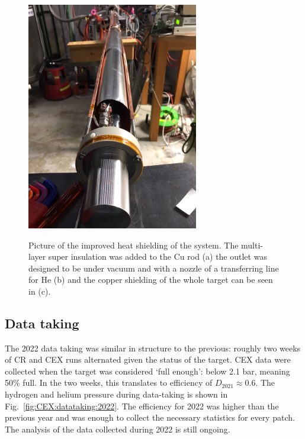 \begin{refsection}
\begin{figure}
{            \includegraphics[height = 10cm, keepaspectratio]{Figures/LH2/2022/CEX2022_shielding.jpeg}}
            \caption{Picture of the improved heat shielding of the system. The multi-layer super insulation was added to the Cu rod (a) the outlet was designed to be under vacuum and with a nozzle of a transferring line for He (b) and the copper shielding of the whole target can be seen in (c).}
            \label{fig:CEX:2022:insulation}
        \end{figure}
        
    \subsection{Data taking}
        The 2022 data taking was similar in structure to the previous: roughly two weeks of CR and CEX runs alternated given the status of the target.
        CEX data were collected when the target was considered `full enough': below 2.1 bar, meaning 50\% full. 
        In the two weeks, this translates to efficiency of $D_{2021}\approx0.6$.
        The hydrogen and helium pressure during data-taking is shown in Fig.~\ref{fig:CEX:datataking:2022}.
        The efficiency for 2022 was higher than the previous year and was enough to collect the necessary statistics for every patch.
        The analysis of the data collected during 2022 is still ongoing.


\end{refsection}

